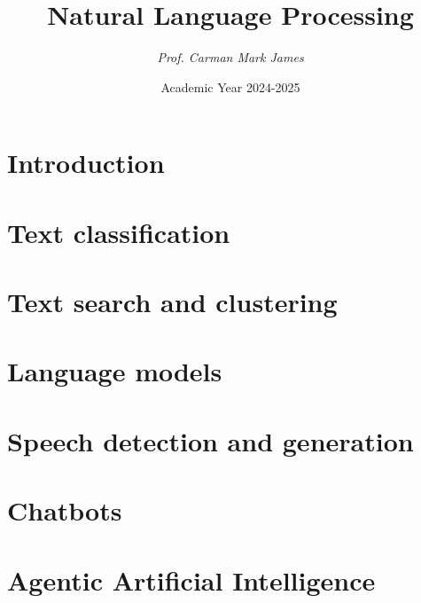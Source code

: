 \documentclass[12pt, a4paper]{report}
\title{\textbf{Natural Language Processing}}
\author{\textit{Prof. Carman Mark James}}
\date{Academic Year 2024-2025}
\begin{document}
    \maketitle

    

    \cleardoublepage{}

    \tableofcontents

    \cleardoublepage{}

    \chapter{Introduction}
    
    
    

    \chapter{Text classification}
    
    
    
    

    \chapter{Text search and clustering}
    
    
    
    
    
    

    \chapter{Language models}
    
    
    
    
    
    
    

    \chapter{Speech detection and generation}
    
    
    

    \chapter{Chatbots}
    
    
    
    
    

    \chapter{Agentic Artificial Intelligence}
    
    
    
\end{document}
